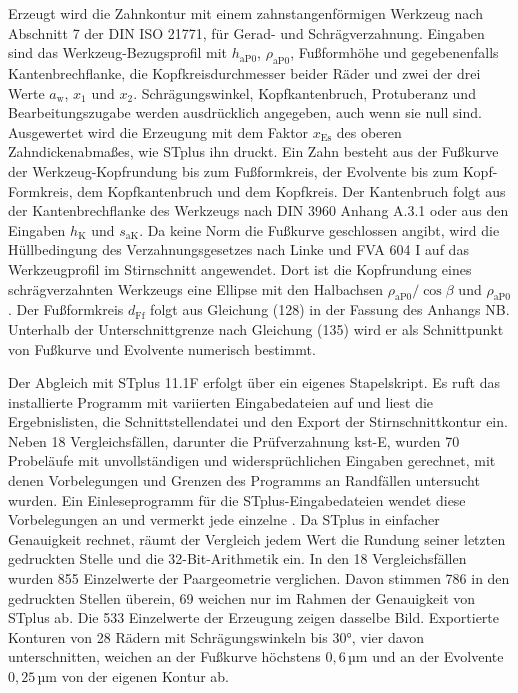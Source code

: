 Erzeugt wird die Zahnkontur mit einem zahnstangenförmigen Werkzeug nach Abschnitt 7 der DIN ISO 21771, für Gerad- und Schrägverzahnung. Eingaben sind das Werkzeug-Bezugsprofil mit $h_{\mathrm{aP0}}$, $\rho_{\mathrm{aP0}}$, Fußformhöhe und gegebenenfalls Kantenbrechflanke, die Kopfkreisdurchmesser beider Räder und zwei der drei Werte $a_{\mathrm{w}}$, $x_1$ und $x_2$. Schrägungswinkel, Kopfkantenbruch, Protuberanz und Bearbeitungszugabe werden ausdrücklich angegeben, auch wenn sie null sind. Ausgewertet wird die Erzeugung mit dem Faktor $x_{\mathrm{Es}}$ des oberen Zahndickenabmaßes, wie STplus ihn druckt. Ein Zahn besteht aus der Fußkurve der Werkzeug-Kopfrundung bis zum Fußformkreis, der Evolvente bis zum Kopf-Formkreis, dem Kopfkantenbruch und dem Kopfkreis. Der Kantenbruch folgt aus der Kantenbrechflanke des Werkzeugs nach DIN 3960 Anhang A.3.1 \cite[S.~14]{DIN3960} oder aus den Eingaben $h_{\mathrm{K}}$ und $s_{\mathrm{aK}}$. Da keine Norm die Fußkurve geschlossen angibt, wird die Hüllbedingung des Verzahnungsgesetzes nach Linke \cite{Lin10} und FVA 604 I \cite{FVA604-I} auf das Werkzeugprofil im Stirnschnitt angewendet. Dort ist die Kopfrundung eines schrägverzahnten Werkzeugs eine Ellipse mit den Halbachsen $\rho_{\mathrm{aP0}}/\cos\beta$ und $\rho_{\mathrm{aP0}}$. Der Fußformkreis $d_{\mathrm{Ff}}$ folgt aus Gleichung (128) in der Fassung des Anhangs NB. Unterhalb der Unterschnittgrenze nach Gleichung (135) wird er als Schnittpunkt von Fußkurve und Evolvente numerisch bestimmt.

Der Abgleich mit STplus 11.1F erfolgt über ein eigenes Stapelskript. Es ruft das installierte Programm mit variierten Eingabedateien auf und liest die Ergebnislisten, die Schnittstellendatei und den Export der Stirnschnittkontur ein. Neben 18 Vergleichsfällen, darunter die Prüfverzahnung kst-E, wurden 70 Probeläufe mit unvollständigen und widersprüchlichen Eingaben gerechnet, mit denen Vorbelegungen und Grenzen des Programms an Randfällen untersucht wurden. Ein Einleseprogramm für die STplus-Eingabedateien wendet diese Vorbelegungen an und vermerkt jede einzelne \cite{STplus11-1F}. Da STplus in einfacher Genauigkeit rechnet, räumt der Vergleich jedem Wert die Rundung seiner letzten gedruckten Stelle und die 32-Bit-Arithmetik ein. In den 18 Vergleichsfällen wurden 855 Einzelwerte der Paargeometrie verglichen. Davon stimmen 786 in den gedruckten Stellen überein, 69 weichen nur im Rahmen der Genauigkeit von STplus ab. Die 533 Einzelwerte der Erzeugung zeigen dasselbe Bild. Exportierte Konturen von 28 Rädern mit Schrägungswinkeln bis $30$°, vier davon unterschnitten, weichen an der Fußkurve höchstens $0{,}6$\,µm und an der Evolvente $0{,}25$\,µm von der eigenen Kontur ab.

